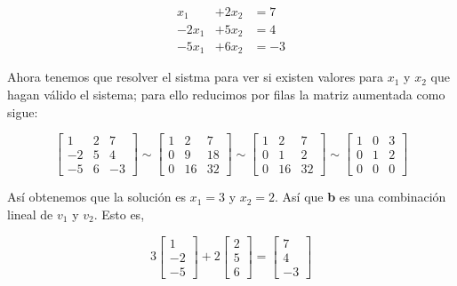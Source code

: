 \documentclass{article}
\begin{document}
\begin{equation*}
    \begin{array}{ccc}
        x_1 &+ 2x_2 &= 7\\
        -2x_1 &+ 5x_2 &= 4\\
        -5x_1 &+ 6x_2 &= -3
    \end{array}
\end{equation*}

Ahora tenemos que resolver el sistma para ver si existen valores para $x_1$ y $x_2$ que hagan válido el sistema; para ello reducimos por filas la matriz aumentada como sigue:

\begin{equation}
    \left[\begin{array}{rr|r}
    1 & 2 & 7 \\
    -2 & 5 & 4 \\
    -5 & 6 & -3
    \end{array}\right] \sim\left[\begin{array}{rr|r}
    1 & 2 & 7 \\
    0 & 9 & 18 \\
    0 & 16 & 32
    \end{array}\right] \sim\left[\begin{array}{rr|r}
    1 & 2 & 7 \\
    0 & 1 & 2 \\
    0 & 16 & 32
    \end{array}\right] \sim\left[\begin{array}{ll|l}
    1 & 0 & 3 \\
    0 & 1 & 2 \\
    0 & 0 & 0
    \end{array}\right]
\end{equation}

Así obtenemos que la solución es $x_1 = 3$ y $x_2 = 2$. Así que \textbf{b} es una combinación lineal de \textbf{$v_1$} y \textbf{$v_2$}. Esto es, 

\begin{equation*}
    3 \begin{bmatrix}
        1\\-2\\-5
    \end{bmatrix} 
    +2 \begin{bmatrix}
        2\\5\\6
    \end{bmatrix}
    = \begin{bmatrix}
        7\\4\\-3
    \end{bmatrix}
\end{equation*}
\end{document}
